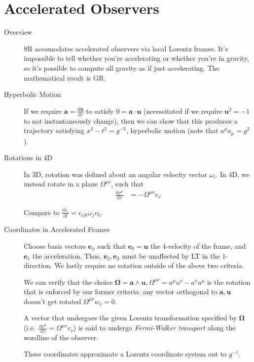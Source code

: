\documentclass[12pt]{report}
\newcommand{\rd}[2]{\frac{\mathrm{d}#1}{\mathrm{d}#2}}
\newcommand{\bm}[1]{\boldsymbol{\mathbf{#1}}}
\begin{document}
\section{Accelerated Observers}

\begin{description}
    \item[Overview] SR accomodates accelerated observers via local Lorentz
        frames. It's impossible to tell whether you're accelerating or whether
        you're in gravity, so it's possible to compute all gravity as if just
        accelerating. The mathematical result is GR\@.

    \item[Hyperbolic Motion] If we require $\bm{a} = \rd{\bm{u}}{\tau}$ to
        satisfy $0 = \bm{a} \cdot \bm{u}$ (necessitated if we require
        $\bm{u}^2 = -1$ to not instantaneously change), then we can show
        that this produces a trajectory satisfying $x^2 - t^2 = g^{-2}$,
        hyperbolic motion (note that $a^\mu a_\mu = g^2$).

    \item[Rotations in 4D] In 3D, rotation was defined about an angular velocity
        vector $\omega_i$. In 4D, we instead rotate in a plane
        $\Omega^{\mu\nu}$, such that
        \begin{align}
            \rd{v^\mu}{\tau} &= -\Omega^{\mu\nu}v_\nu
        \end{align}

        Compare to $\rd{v_i}{t} = \epsilon_{ijk} \omega_j v_k$.

    \item[Coordinates in Accelerated Frames] Choose basis vectors
        $\bm{e}_\alpha$ such that $\bm{e}_0 = \bm{u}$ the 4-velocity
        of the frame, and $\bm{e}_1$ the acceleration. Thus, $\bm{e}_2,
        \bm{e}_3$ must be unaffected by LT in the 1-direction. We lastly
        require no rotation outside of the above two criteria.

        We can verify that the choice $\bm{\Omega} = \bm{a} \wedge
        \bm{u}, \Omega^{\mu\nu} = a^\mu u^\nu - a^\nu u^\mu$ is the rotation
        that is enforced by our former criteria: any vector orthogonal to
        $\bm{a}, \bm{u}$ doesn't get rotated $\Omega^{\mu\nu}w_\nu = 0$.

        A vector that undergoes the given Lorentz transformation specified by
        $\bm{\Omega}$ (i.e.\ $\rd{v^\mu}{\tau} = \Omega^{\mu\nu}v_\nu$) is
        said to undergo \emph{Fermi-Walker transport} along the wordline of the
        observer.

        These coordinates approximate a Lorentz coordinate system out to
        $g^{-1}$.

\end{description}
\end{document}
